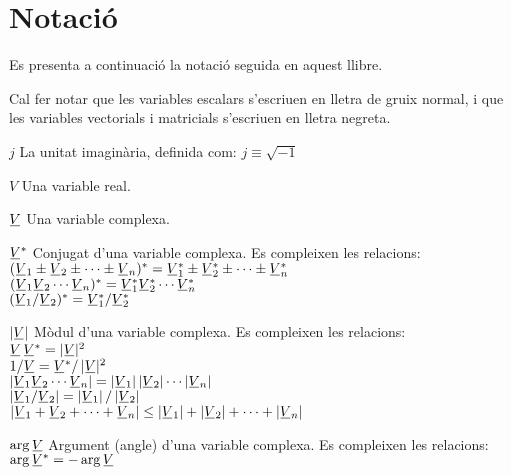 \chapter*{Notació} 

Es presenta a continuació la notació seguida en aquest llibre.

Cal fer notar que les variables escalars
s'escriuen en lletra  de gruix normal, i que les variables vectorials i matricials s'escriuen
en lletra negreta.

\begin{list}{}
{\setlength{\labelwidth}{15mm} \setlength{\leftmargin}{20mm}
\setlength{\labelsep}{5mm}}
    \item[$j$] La unitat imaginària, definida com:
    $j\equiv\sqrt{-1}$
    \item[$V$] Una variable real.
    \item[$\cmplx{V}$] Una variable complexa.
    \item[$\cmplx{V}^*$] Conjugat d'una variable complexa.
    Es compleixen les relacions:\\[1ex]
     $(\cmplx{V}_1 \pm \cmplx{V}_2 \pm \cdots  \pm \cmplx{V}_n)^* = \cmplx{V}_1^* \pm
    \cmplx{V}_2^*\pm\cdots\pm\cmplx{V}_n^*$\\[1ex]
    $(\cmplx{V}_1 \cmplx{V}_2 \cdots \cmplx{V}_n)^* = \cmplx{V}_1^*  \cmplx{V}_2^*
    \cdots \cmplx{V}_n^*$\\[1ex]
    $(\cmplx{V}_1 / \cmplx{V}_2)^* = \cmplx{V}_1^* / \cmplx{V}_2^*$
    \item[$|\cmplx{V}|$] Mòdul d'una variable complexa.
    Es compleixen les relacions:\\[1ex]
      $\cmplx{V}\,\cmplx{V}^* = |\cmplx{V}|^2$\\[1ex]
      $1/ \cmplx{V} = \cmplx{V}^* / \,|\cmplx{V}|^2$\\[1ex]
      $|\cmplx{V}_1 \cmplx{V}_2 \cdots \cmplx{V}_n| =
       |\cmplx{V}_1| \,|\cmplx{V}_2| \cdots |\cmplx{V}_n|$\\[1ex]
       $|\cmplx{V}_1 / \cmplx{V}_2| = |\cmplx{V}_1| \,/ \,|\cmplx{V}_2|$\\[1ex]
      $|\cmplx{V}_1+\cmplx{V}_2+\cdots+\cmplx{V}_n| \leq
      |\cmplx{V}_1| + |\cmplx{V}_2| + \cdots  +|\cmplx{V}_n|$
    \item[$\arg\cmplx{V}$] Argument (angle) d'una variable complexa.
     Es compleixen les relacions:\\[1ex]
      $\arg\cmplx{V}^* = - \arg\cmplx{V}$\\[1ex]

\end{list}
